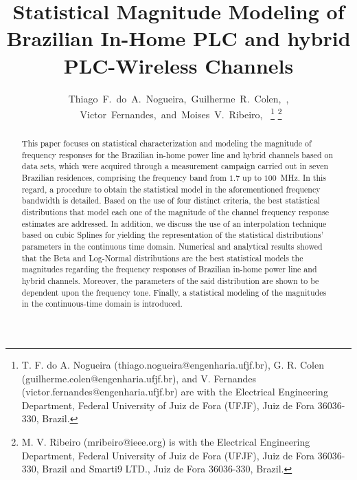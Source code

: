 \documentclass[journal]{IEEEtran}
\begin{document}

\title{Statistical Magnitude Modeling of Brazilian In-Home PLC and hybrid PLC-Wireless Channels}

\author{Thiago~F.~do~A.~Nogueira,~Guilherme~R.~Colen,~,
	~Victor~Fernandes,~and~Moises~V.~Ribeiro,~
\thanks{T. F. do A. Nogueira (thiago.nogueira@engenharia.ufjf.br), G. R. Colen (guilherme.colen@engenharia.ufjf.br), and V. Fernandes (victor.fernandes@engenharia.ufjf.br) are with the Electrical Engineering Department, Federal University of Juiz	de Fora (UFJF), Juiz de Fora 36036-330, Brazil.}
\thanks{M. V. Ribeiro (mribeiro@ieee.org) is with the Electrical Engineering
	Department, Federal University of Juiz de Fora (UFJF), Juiz de Fora 36036-330, Brazil and Smarti9 LTD., Juiz de Fora 36036-330, Brazil.}}


\maketitle

\begin{abstract}
This paper focuses on statistical characterization and modeling the magnitude of frequency responses for the Brazilian in-home power line and hybrid channels based on data sets, which were acquired through a measurement campaign carried out in seven Brazilian residences, comprising the frequency band from $1.7$ up to $100$~MHz. In this regard, a procedure to obtain the statistical model in the aforementioned frequency bandwidth is detailed. Based on the use of four distinct criteria, the best statistical distributions that model each one of the magnitude of the channel frequency response estimates are addressed. In addition, we discuss the use of an interpolation technique based on cubic Splines for yielding the representation of the statistical distributions' parameters in the continuous time domain. Numerical and analytical results showed that the Beta and Log-Normal distributions are the best statistical models the magnitudes regarding the frequency responses of Brazilian in-home power line and hybrid channels. Moreover, the parameters of the said distribution are shown to be dependent upon the frequency tone. Finally, a statistical modeling of the magnitudes in the continuous-time domain is introduced.  

\end{abstract}
\end{document}
